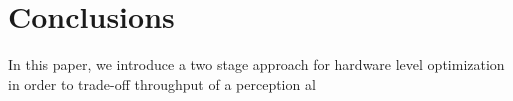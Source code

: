 \section{Conclusions}

In this paper, we introduce a two stage approach for hardware level optimization in order to trade-off throughput of a perception al
